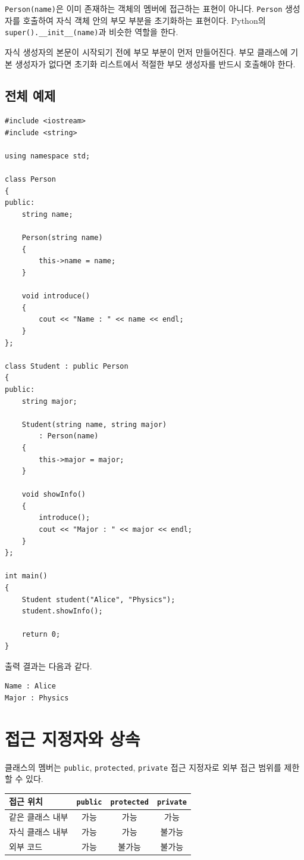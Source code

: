 \documentclass[11pt,a4paper]{article}
\begin{document}
\texttt{Person(name)}은 이미 존재하는 객체의 멤버에 접근하는 표현이 아니다. \texttt{Person} 생성자를 호출하여 자식 객체 안의 부모 부분을 초기화하는 표현이다. Python의 \texttt{super().\_\_init\_\_(name)}과 비슷한 역할을 한다.

\begin{importantbox}
자식 생성자의 본문이 시작되기 전에 부모 부분이 먼저 만들어진다. 부모 클래스에 기본 생성자가 없다면 초기화 리스트에서 적절한 부모 생성자를 반드시 호출해야 한다.
\end{importantbox}

\subsection{전체 예제}
\begin{lstlisting}
#include <iostream>
#include <string>

using namespace std;

class Person
{
public:
    string name;

    Person(string name)
    {
        this->name = name;
    }

    void introduce()
    {
        cout << "Name : " << name << endl;
    }
};

class Student : public Person
{
public:
    string major;

    Student(string name, string major)
        : Person(name)
    {
        this->major = major;
    }

    void showInfo()
    {
        introduce();
        cout << "Major : " << major << endl;
    }
};

int main()
{
    Student student("Alice", "Physics");
    student.showInfo();

    return 0;
}
\end{lstlisting}

출력 결과는 다음과 같다.

\begin{verbatim}
Name : Alice
Major : Physics
\end{verbatim}

\section{접근 지정자와 상속}
클래스의 멤버는 \texttt{public}, \texttt{protected}, \texttt{private} 접근 지정자로 외부 접근 범위를 제한할 수 있다.

\begin{center}
\begin{tabular}{lccc}
\toprule
접근 위치 & \texttt{public} & \texttt{protected} & \texttt{private} \\
\midrule
같은 클래스 내부 & 가능 & 가능 & 가능 \\
자식 클래스 내부 & 가능 & 가능 & 불가능 \\
외부 코드 & 가능 & 불가능 & 불가능 \\
\bottomrule
\end{tabular}
\end{center}
\end{document}
